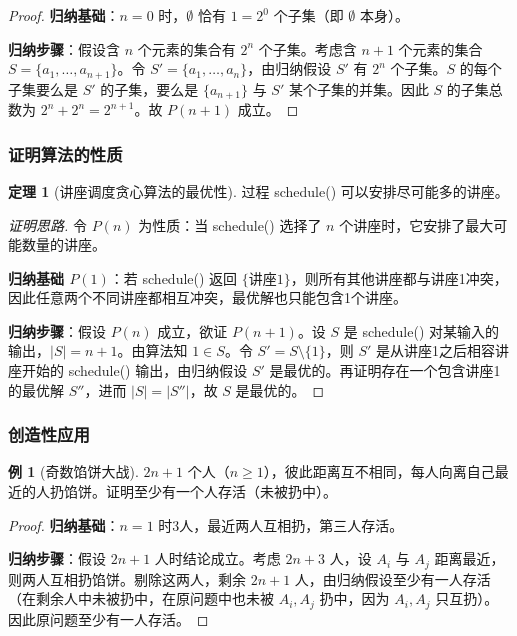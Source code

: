 \documentclass[UTF8,11pt,a4paper]{ctexbook}   %
\theoremstyle{definition}
\newtheorem{theorem}{定理}[section]
\newtheorem{example}{例}[section]
\begin{document}
\begin{proof}
\textbf{归纳基础}：$n=0$ 时，$\emptyset$ 恰有 $1=2^0$ 个子集（即 $\emptyset$ 本身）。

\textbf{归纳步骤}：假设含 $n$ 个元素的集合有 $2^n$ 个子集。考虑含 $n+1$ 个元素的集合 $S = \{a_1,\dots,a_{n+1}\}$。令 $S' = \{a_1,\dots,a_n\}$，由归纳假设 $S'$ 有 $2^n$ 个子集。$S$ 的每个子集要么是 $S'$ 的子集，要么是 $\{a_{n+1}\}$ 与 $S'$ 某个子集的并集。因此 $S$ 的子集总数为 $2^n + 2^n = 2^{n+1}$。故 $P(n+1)$ 成立。
\end{proof}

\subsubsection{证明算法的性质}

\begin{theorem}[讲座调度贪心算法的最优性]
过程 schedule() 可以安排尽可能多的讲座。
\end{theorem}

\begin{proof}[证明思路]
令 $P(n)$ 为性质：当 schedule() 选择了 $n$ 个讲座时，它安排了最大可能数量的讲座。

\textbf{归纳基础 $P(1)$}：若 schedule() 返回 $\{\text{讲座}1\}$，则所有其他讲座都与讲座1冲突，因此任意两个不同讲座都相互冲突，最优解也只能包含1个讲座。

\textbf{归纳步骤}：假设 $P(n)$ 成立，欲证 $P(n+1)$。设 $S$ 是 schedule() 对某输入的输出，$|S|=n+1$。由算法知 $1 \in S$。令 $S' = S \setminus \{1\}$，则 $S'$ 是从讲座1之后相容讲座开始的 schedule() 输出，由归纳假设 $S'$ 是最优的。再证明存在一个包含讲座1的最优解 $S''$，进而 $|S|=|S''|$，故 $S$ 是最优的。
\end{proof}

\subsubsection{创造性应用}

\begin{example}[奇数馅饼大战]
$2n+1$ 个人（$n \geq 1$），彼此距离互不相同，每人向离自己最近的人扔馅饼。证明至少有一个人存活（未被扔中）。
\end{example}

\begin{proof}
\textbf{归纳基础}：$n=1$ 时3人，最近两人互相扔，第三人存活。

\textbf{归纳步骤}：假设 $2n+1$ 人时结论成立。考虑 $2n+3$ 人，设 $A_i$ 与 $A_j$ 距离最近，则两人互相扔馅饼。剔除这两人，剩余 $2n+1$ 人，由归纳假设至少有一人存活（在剩余人中未被扔中，在原问题中也未被 $A_i,A_j$ 扔中，因为 $A_i,A_j$ 只互扔）。因此原问题至少有一人存活。
\end{proof}
\end{document}
